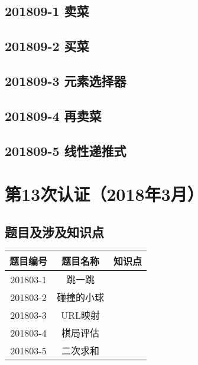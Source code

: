 \documentclass[cn,10pt,math=newtx,citestyle=gb7714-2015,bibstyle=gb7714-2015]{elegantbook}
\newif\ifonlyanalyze %
\begin{document}
\newpage
\section{201809-1 卖菜}
\ifonlyanalyze
\else
    
\fi


\newpage
\section{201809-2 买菜}
\ifonlyanalyze
\else
    
\fi


\newpage
\section{201809-3 元素选择器}
\ifonlyanalyze
\else
    
\fi


\newpage
\section{201809-4 再卖菜}
\ifonlyanalyze
\else
    
\fi


\newpage
\section{201809-5 线性递推式}
\ifonlyanalyze
\else
    
\fi



\chapter{第13次认证（2018年3月）}

\section{题目及涉及知识点}

\begin{table}[htbp]
    \centering
    \begin{tabular}{ccc}
        \toprule
        题目编号 & 题目名称   & 知识点 \\
        \midrule
        201803-1 & 跳一跳     &        \\
        201803-2 & 碰撞的小球 &        \\
        201803-3 & URL映射    &        \\
        201803-4 & 棋局评估   &        \\
        201803-5 & 二次求和   &        \\
        \bottomrule
    \end{tabular}
\end{table}
\end{document}
